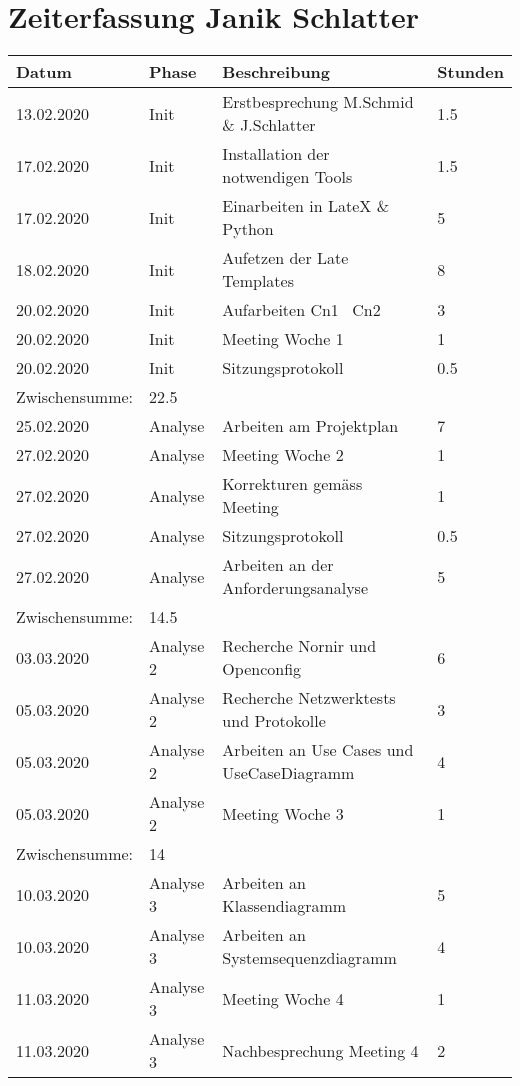 \documentclass[
	ngerman,
	toc=listof, %
	toc=bibliography, %
	footnotes=multiple, %
	parskip=half, %
	numbers=noendperiod %
]{scrartcl}
\begin{document}
\section{Zeiterfassung Janik Schlatter}
	\begin{tabularx}{\textwidth}{llXl}
		\toprule
		Datum & Phase & Beschreibung & Stunden \\
		\midrule
		13.02.2020 & Init & Erstbesprechung M.Schmid \& J.Schlatter & 1.5 \\
		17.02.2020 & Init & Installation der notwendigen Tools & 1.5 \\
		17.02.2020 & Init & Einarbeiten in LateX \& Python & 5 \\
		18.02.2020 & Init & Aufetzen der Late Templates & 8 \\
		20.02.2020 & Init & Aufarbeiten Cn1 \ Cn2 & 3 \\
		20.02.2020 & Init & Meeting Woche 1 & 1 \\
		20.02.2020 & Init & Sitzungsprotokoll & 0.5 \\
		\midrule
		Zwischensumme: & 22.5 & & \\
		\midrule
		25.02.2020 & Analyse & Arbeiten am Projektplan & 7 \\
		27.02.2020 & Analyse & Meeting Woche 2 & 1 \\
		27.02.2020 & Analyse & Korrekturen gemäss Meeting & 1 \\
		27.02.2020 & Analyse & Sitzungsprotokoll & 0.5 \\
		27.02.2020 & Analyse & Arbeiten an der Anforderungsanalyse & 5 \\
		\midrule
		Zwischensumme: & 14.5 & & \\
		\midrule
		03.03.2020 & Analyse 2 & Recherche Nornir und Openconfig & 6 \\
		05.03.2020 & Analyse 2 & Recherche Netzwerktests und Protokolle & 3 \\
		05.03.2020 & Analyse 2 & Arbeiten an Use Cases und UseCaseDiagramm & 4 \\
		05.03.2020 & Analyse 2 & Meeting Woche 3 & 1 \\
		\midrule
		Zwischensumme: & 14 & & \\
		\midrule
		10.03.2020 & Analyse 3 & Arbeiten an Klassendiagramm & 5 \\
		10.03.2020 & Analyse 3 & Arbeiten an Systemsequenzdiagramm & 4 \\
		11.03.2020 & Analyse 3 & Meeting Woche 4 & 1 \\
		11.03.2020 & Analyse 3 & Nachbesprechung Meeting 4 & 2 \\

\end{tabularx}
\end{document}
